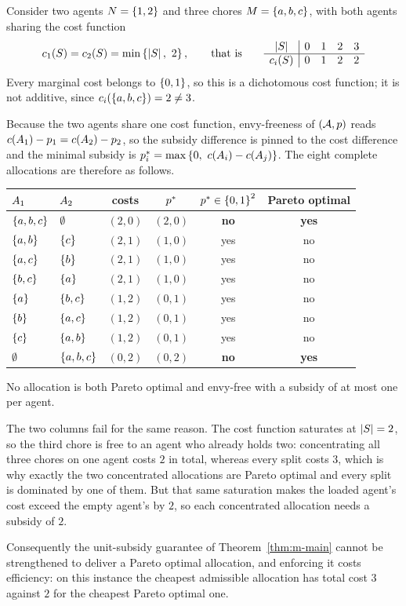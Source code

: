 \begin{example}
\label{app:pareto}
Consider two agents $N = \left\{1,2\right\}$ and three chores
$M = \left\{a,b,c\right\}$, with both agents sharing the cost function
\[
  c_1(S) = c_2(S) = \min\left\{\left\lvert S\right\rvert,\ 2\right\},
  \qquad\text{that is}\qquad
  \begin{array}{c|cccc}
    \left\lvert S\right\rvert & 0 & 1 & 2 & 3 \\
    \hline
    c_i(S) & 0 & 1 & 2 & 2
  \end{array}
\]
Every marginal cost belongs to $\left\{0,1\right\}$, so this is a dichotomous cost
function; it is not additive, since $c_i(\left\{a,b,c\right\}) = 2 \ne 3$.

Because the two agents share one cost function, envy-freeness of
$(\mathcal{A},p)$ reads $c(A_{1}) - p_1 = c(A_{2}) - p_2$,
so the subsidy difference is pinned to the cost difference and the minimal
subsidy is $p^{*}_i = \max\left\{0,\ c(A_{i}) - c(A_{j})\right\}$.
The eight complete allocations are therefore as follows.

\begin{center}
\begin{tabular}{llccc c}
$A_{1}$ & $A_{2}$ & costs & $p^{*}$ & $p^{*} \in \left\{0,1\right\}^2$ & Pareto optimal \\
\hline
$\left\{a,b,c\right\}$ & $\emptyset$ & $(2,0)$ & $(2,0)$ & \textbf{no} & \textbf{yes} \\
$\left\{a,b\right\}$ & $\left\{c\right\}$ & $(2,1)$ & $(1,0)$ & yes & no \\
$\left\{a,c\right\}$ & $\left\{b\right\}$ & $(2,1)$ & $(1,0)$ & yes & no \\
$\left\{b,c\right\}$ & $\left\{a\right\}$ & $(2,1)$ & $(1,0)$ & yes & no \\
$\left\{a\right\}$ & $\left\{b,c\right\}$ & $(1,2)$ & $(0,1)$ & yes & no \\
$\left\{b\right\}$ & $\left\{a,c\right\}$ & $(1,2)$ & $(0,1)$ & yes & no \\
$\left\{c\right\}$ & $\left\{a,b\right\}$ & $(1,2)$ & $(0,1)$ & yes & no \\
$\emptyset$ & $\left\{a,b,c\right\}$ & $(0,2)$ & $(0,2)$ & \textbf{no} & \textbf{yes} \\
\end{tabular}
\end{center}

No allocation is both Pareto optimal and envy-free with a subsidy of at most
one per agent.
\end{example}

The two columns fail for the same reason. The cost function saturates at
$\left\lvert S\right\rvert = 2$, so the third chore is free to an agent who already holds two:
concentrating all three chores on one agent costs $2$ in total, whereas every
split costs $3$, which is why exactly the two concentrated allocations are
Pareto optimal and every split is dominated by one of them. But that same
saturation makes the loaded agent's cost exceed the empty agent's by $2$, so
each concentrated allocation needs a subsidy of $2$.

Consequently the unit-subsidy guarantee of Theorem~\ref{thm:m-main} cannot be
strengthened to deliver a Pareto optimal allocation, and enforcing it costs
efficiency: on this instance the cheapest admissible allocation has total cost
$3$ against $2$ for the cheapest Pareto optimal one.
